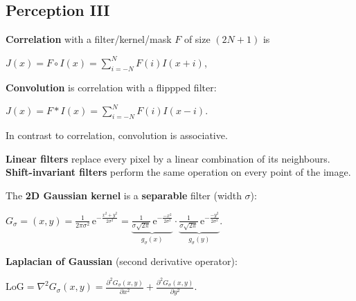\documentclass[landscape]{article}
\newcommand{\vmspace}{\vspace{-7pt}}
\newcommand{\vpspace}{\vspace{5pt}}
\newcommand{\vtspace}{\vspace{-10pt}}
\begin{document}
\begin{multicols}{3}
\vtspace

\section{Perception III}

\vmspace

\begin{minipage}{\columnwidth}
  \textbf{Correlation} with a filter/kernel/mask $F$ of size $(2N+1)$ is
  \vmspace
  \begin{center}
    $J(x) = F \circ I(x) = \sum_{i=-N}^N F(i) I(x + i)$,
  \end{center}
\end{minipage}

\begin{minipage}{\columnwidth}
  \textbf{Convolution} is correlation with a flippped filter:
  \vmspace
  \begin{center}
    $J(x) = F \ast I(x) = \sum_{i=-N}^N F(i) I(x - i)$.
  \end{center}
  \vmspace
  In contrast to correlation, convolution is associative.
\end{minipage}

\vpspace

\begin{minipage}{\columnwidth}
  \textbf{Linear filters} replace every pixel by a linear combination of its
  neighbours. \textbf{Shift-invariant filters} perform the same operation on
  every point of the image.
\end{minipage}

\vpspace

\begin{minipage}{\columnwidth}
  The \textbf{2D Gaussian kernel} is a \textbf{separable} filter (width
  $\sigma$):
  \vmspace
  \begin{center}
    $
    G_\sigma = (x, y) = \frac{1}{2\pi\sigma^2}
    \,\mathrm e^{-\frac{x^2 + y^2}{2 \sigma ^2}}
    =
    \underbrace{\tfrac{1}{\sigma \sqrt{2\pi}}
    \,\mathrm e^{-\frac{-x^2}{2\sigma^2}}}_{g_\sigma(x)}
    \cdot
    \underbrace{\tfrac{1}{\sigma \sqrt{2\pi}}
    \,\mathrm e^{-\frac{-y^2}{2\sigma^2}}}_{g_\sigma(y)}.
    $
  \end{center}
\end{minipage}

\vpspace

\begin{minipage}{\columnwidth}
  \textbf{Laplacian of Gaussian} (second derivative operator):
  \vmspace
  \begin{center}
    $\mathrm{LoG} = \nabla^2 G_\sigma(x, y) = \frac{\partial^2 G_\sigma(x,
    y)}{\partial x^2} + \frac{\partial^2 G_\sigma(x, y)}{\partial y^2}.
    $
  \end{center}
\end{minipage}


\end{multicols}
\end{document}
